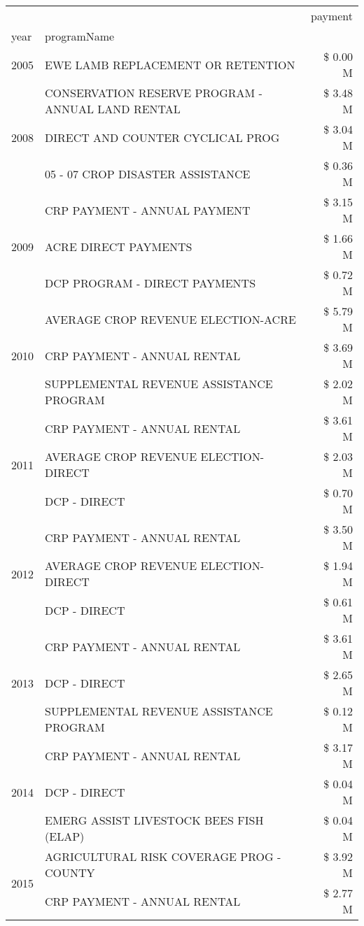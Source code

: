\begin{tabular}{llr}
\toprule
 &  & payment \\
year & programName &  \\
\midrule
2005 & EWE LAMB REPLACEMENT OR RETENTION & \$ 0.00 M \\
\cline{1-3}
\multirow[t]{3}{*}{2008} & CONSERVATION RESERVE PROGRAM - ANNUAL LAND RENTAL & \$ 3.48 M \\
 & DIRECT AND COUNTER CYCLICAL PROG & \$ 3.04 M \\
 & 05 - 07 CROP DISASTER ASSISTANCE & \$ 0.36 M \\
\cline{1-3}
\multirow[t]{3}{*}{2009} & CRP PAYMENT - ANNUAL PAYMENT & \$ 3.15 M \\
 & ACRE DIRECT PAYMENTS & \$ 1.66 M \\
 & DCP PROGRAM - DIRECT PAYMENTS & \$ 0.72 M \\
\cline{1-3}
\multirow[t]{3}{*}{2010} & AVERAGE CROP REVENUE ELECTION-ACRE & \$ 5.79 M \\
 & CRP PAYMENT - ANNUAL RENTAL & \$ 3.69 M \\
 & SUPPLEMENTAL REVENUE ASSISTANCE PROGRAM & \$ 2.02 M \\
\cline{1-3}
\multirow[t]{3}{*}{2011} & CRP PAYMENT - ANNUAL RENTAL & \$ 3.61 M \\
 & AVERAGE CROP REVENUE ELECTION-DIRECT & \$ 2.03 M \\
 & DCP - DIRECT & \$ 0.70 M \\
\cline{1-3}
\multirow[t]{3}{*}{2012} & CRP PAYMENT - ANNUAL RENTAL & \$ 3.50 M \\
 & AVERAGE CROP REVENUE ELECTION-DIRECT & \$ 1.94 M \\
 & DCP - DIRECT & \$ 0.61 M \\
\cline{1-3}
\multirow[t]{3}{*}{2013} & CRP PAYMENT - ANNUAL RENTAL & \$ 3.61 M \\
 & DCP - DIRECT & \$ 2.65 M \\
 & SUPPLEMENTAL REVENUE ASSISTANCE PROGRAM & \$ 0.12 M \\
\cline{1-3}
\multirow[t]{3}{*}{2014} & CRP PAYMENT - ANNUAL RENTAL & \$ 3.17 M \\
 & DCP - DIRECT & \$ 0.04 M \\
 & EMERG ASSIST LIVESTOCK BEES FISH (ELAP) & \$ 0.04 M \\
\cline{1-3}
\multirow[t]{3}{*}{2015} & AGRICULTURAL RISK COVERAGE PROG - COUNTY & \$ 3.92 M \\
 & CRP PAYMENT - ANNUAL RENTAL & \$ 2.77 M \\

\end{tabular}
